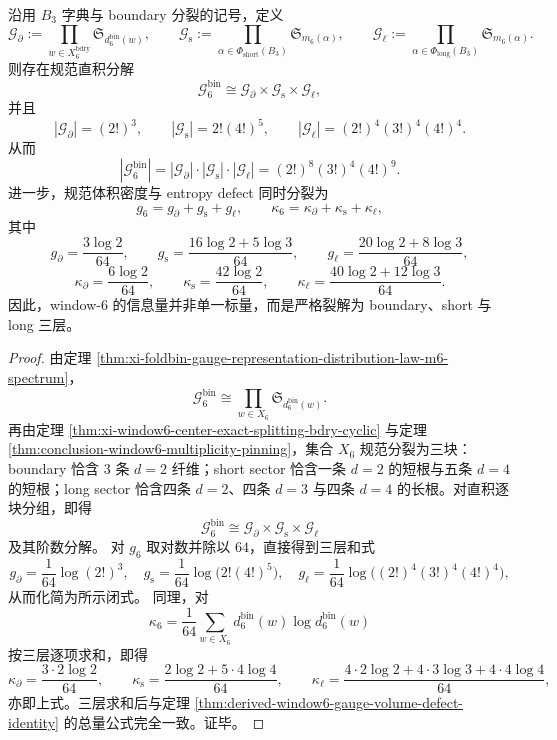 \begin{theorem}\label{thm:conclusion-window6-gauge-volume-geometric-stratification}
沿用 \(B_3\) 字典与 boundary 分裂的记号，定义
\[
\mathcal G_{\partial}:=
\prod_{w\in X_6^{\mathrm{bdry}}}\mathfrak S_{d_6^{\mathrm{bin}}(w)},
\qquad
\mathcal G_{\mathrm{s}}:=
\prod_{\alpha\in \Phi_{\mathrm{short}}(B_3)}\mathfrak S_{m_6(\alpha)},
\qquad
\mathcal G_{\ell}:=
\prod_{\alpha\in \Phi_{\mathrm{long}}(B_3)}\mathfrak S_{m_6(\alpha)}.
\]
则存在规范直积分解
\[
\mathcal G_6^{\mathrm{bin}}
\cong
\mathcal G_{\partial}\times \mathcal G_{\mathrm{s}}\times \mathcal G_{\ell},
\]
并且
\[
|\mathcal G_{\partial}|=(2!)^3,
\qquad
|\mathcal G_{\mathrm{s}}|=2!(4!)^5,
\qquad
|\mathcal G_{\ell}|=(2!)^4(3!)^4(4!)^4.
\]
从而
\[
|\mathcal G_6^{\mathrm{bin}}|
=
|\mathcal G_{\partial}|\cdot |\mathcal G_{\mathrm{s}}|\cdot |\mathcal G_{\ell}|
=(2!)^8(3!)^4(4!)^9.
\]
进一步，规范体积密度与 entropy defect 同时分裂为
\[
g_6=g_{\partial}+g_{\mathrm{s}}+g_{\ell},
\qquad
\kappa_6=\kappa_{\partial}+\kappa_{\mathrm{s}}+\kappa_{\ell},
\]
其中
\[
g_{\partial}=\frac{3\log 2}{64},
\qquad
g_{\mathrm{s}}=\frac{16\log 2+5\log 3}{64},
\qquad
g_{\ell}=\frac{20\log 2+8\log 3}{64},
\]
\[
\kappa_{\partial}=\frac{6\log 2}{64},
\qquad
\kappa_{\mathrm{s}}=\frac{42\log 2}{64},
\qquad
\kappa_{\ell}=\frac{40\log 2+12\log 3}{64}.
\]
因此，window-\(6\) 的信息量并非单一标量，而是严格裂解为 boundary、short 与 long 三层。
\end{theorem}
\begin{proof}
由定理 \ref{thm:xi-foldbin-gauge-representation-distribution-law-m6-spectrum}，
\[
\mathcal G_6^{\mathrm{bin}}
\cong
\prod_{w\in X_6}\mathfrak S_{d_6^{\mathrm{bin}}(w)}.
\]
再由定理 \ref{thm:xi-window6-center-exact-splitting-bdry-cyclic} 与定理 \ref{thm:conclusion-window6-multiplicity-pinning}，集合 \(X_6\) 规范分裂为三块：boundary 恰含 \(3\) 条 \(d=2\) 纤维；short sector 恰含一条 \(d=2\) 的短根与五条 \(d=4\) 的短根；long sector 恰含四条 \(d=2\)、四条 \(d=3\) 与四条 \(d=4\) 的长根。对直积逐块分组，即得
\[
\mathcal G_6^{\mathrm{bin}}
\cong
\mathcal G_{\partial}\times \mathcal G_{\mathrm{s}}\times \mathcal G_{\ell}
\]
及其阶数分解。
对 \(g_6\) 取对数并除以 \(64\)，直接得到三层和式
\[
g_{\partial}=\frac{1}{64}\log(2!)^3,
\quad
g_{\mathrm{s}}=\frac{1}{64}\log\!\bigl(2!(4!)^5\bigr),
\quad
g_{\ell}=\frac{1}{64}\log\!\bigl((2!)^4(3!)^4(4!)^4\bigr),
\]
从而化简为所示闭式。
同理，对
\[
\kappa_6=\frac{1}{64}\sum_{w\in X_6} d_6^{\mathrm{bin}}(w)\log d_6^{\mathrm{bin}}(w)
\]
按三层逐项求和，即得
\[
\kappa_{\partial}=\frac{3\cdot 2\log 2}{64},
\qquad
\kappa_{\mathrm{s}}=\frac{2\log 2+5\cdot 4\log 4}{64},
\qquad
\kappa_{\ell}=\frac{4\cdot 2\log 2+4\cdot 3\log 3+4\cdot 4\log 4}{64},
\]
亦即上式。三层求和后与定理 \ref{thm:derived-window6-gauge-volume-defect-identity} 的总量公式完全一致。证毕。
\end{proof}

